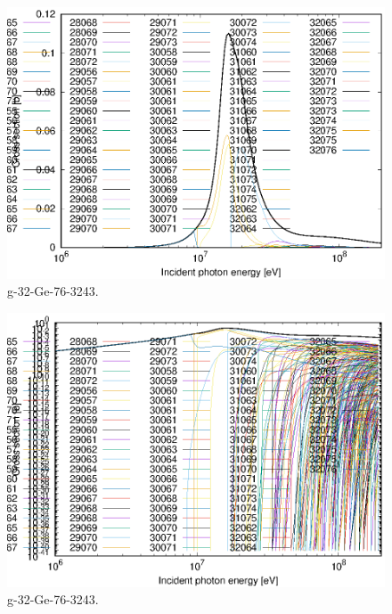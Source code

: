 \begin{figure}
 \includegraphics[width=\linewidth]{eps/g_32-Ge-76_3243.eps}
  \caption{g-32-Ge-76-3243.}
\end{figure}
\begin{figure}
 \includegraphics[width=\linewidth]{eps-log/g_32-Ge-76_3243.eps}
 \caption{g-32-Ge-76-3243.}
\end{figure}
\newpage \clearpage

